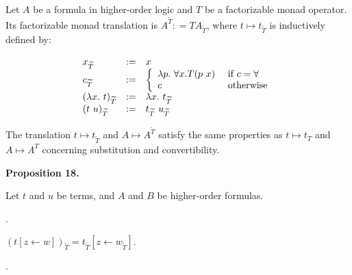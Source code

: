 \documentclass[10pt,a4paper]{article}
\begin{document}
Let $A$ be a formula in higher-order logic and $T$ be a factorizable monad operator. Its factorizable monad translation is $A^{\widetilde{T}}\mathrel{\mathop{:}}=TA_{\widetilde{T}}$, where $t\mapsto t_{\widetilde{T}}$ is inductively defined by:\par
    \[\begin{array}[]{lll}x_{\widetilde{T}}&\mathrel{\mathop{:}}=&x\\
c_{\widetilde{T}}&\mathrel{\mathop{:}}=&\left\{\begin{array}[]{ll}\lambda p.\leavevmode\nobreak\ {\forall}x.T(p\leavevmode\nobreak\ x)&\text{ if $c={\forall}$}\\
c&\text{ otherwise}\\
\end{array}\right.\\
(\lambda x.\leavevmode\nobreak\ t)_{\widetilde{T}}&\mathrel{\mathop{:}}=&\lambda x.\leavevmode\nobreak\ t_{\widetilde{T}}\\
(t\leavevmode\nobreak\ u)_{\widetilde{T}}&\mathrel{\mathop{:}}=&t_{\widetilde{T}}\leavevmode\nobreak\ u_{\widetilde{T}}\\
\end{array}\]    
 
 
 
The translation $t\mapsto t_{\widetilde{T}}$ and $A\mapsto A^{\widetilde{T}}$ satisfy the same properties as $t\mapsto t_{T}$ and $A\mapsto A^{T}$ concerning substitution and convertibility.\par
 
 
 
\par\medskip\noindent\textbf{Proposition 18.}\par
 
 
Let $t$ and $u$ be terms, and $A$ and $B$ be higher-order formulas.\par
  
\par{}. 
 
$(t[z\leftarrow w])_{\widetilde{T}}=t_{\widetilde{T}}[z\leftarrow w_{\widetilde{T}}]$.\par
 
 
 
\par{}. 
 
\end{document}
